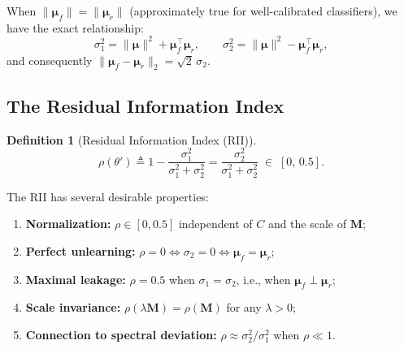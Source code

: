 \documentclass[journal]{IEEEtran}
\theoremstyle{definition}
\newtheorem{definition}[theorem]{Definition}
\newcommand{\coloneqq}{\triangleq}
\begin{document}
When $\|\boldsymbol{\mu}_f\| = \|\boldsymbol{\mu}_r\|$ (approximately true for well-calibrated classifiers), we have the exact relationship:
\begin{equation}
\sigma_1^2 = \|\boldsymbol{\mu}\|^2 + \boldsymbol{\mu}_f^\top\boldsymbol{\mu}_r, \qquad
\sigma_2^2 = \|\boldsymbol{\mu}\|^2 - \boldsymbol{\mu}_f^\top\boldsymbol{\mu}_r,
\label{eq:sigma_norm}
\end{equation}
and consequently $\|\boldsymbol{\mu}_f - \boldsymbol{\mu}_r\|_2 = \sqrt{2}\,\sigma_2$.

\subsection{The Residual Information Index}

\begin{definition}[Residual Information Index (RII)]
\label{def:rii}
\begin{equation}
\boxed{
\rho(\theta') \coloneqq 1 - \frac{\sigma_1^2}{\sigma_1^2 + \sigma_2^2}
= \frac{\sigma_2^2}{\sigma_1^2 + \sigma_2^2}
\;\in\; [0,\,0.5].
}
\label{eq:rho}
\end{equation}
\end{definition}

The RII has several desirable properties:
\begin{enumerate}
\item \textbf{Normalization:} $\rho \in [0, 0.5]$ independent of $C$ and the scale of $\mathbf{M}$;
\item \textbf{Perfect unlearning:} $\rho = 0 \iff \sigma_2 = 0 \iff \boldsymbol{\mu}_f = \boldsymbol{\mu}_r$;
\item \textbf{Maximal leakage:} $\rho = 0.5$ when $\sigma_1 = \sigma_2$, i.e., when $\boldsymbol{\mu}_f \perp \boldsymbol{\mu}_r$;
\item \textbf{Scale invariance:} $\rho(\lambda\mathbf{M}) = \rho(\mathbf{M})$ for any $\lambda > 0$;
\item \textbf{Connection to spectral deviation:} $\rho \approx \sigma_2^2/\sigma_1^2$ when $\rho \ll 1$.
\end{enumerate}
\end{document}
